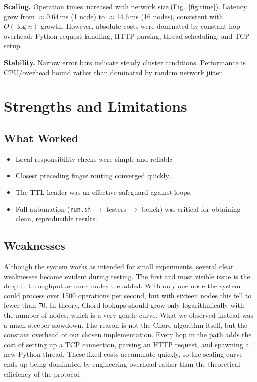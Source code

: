 \documentclass[conference]{IEEEtran}
\begin{document}
\textbf{Scaling.} Operation times increased with network size (Fig.~\ref{fig:time}). Latency grew from $\approx$0.64\,ms (1 node) to $\approx$14.6\,ms (16 nodes), consistent with $O(\log n)$ growth. However, absolute costs were dominated by constant hop overhead: Python request handling, HTTP parsing, thread scheduling, and TCP setup.  

\textbf{Stability.} Narrow error bars indicate steady cluster conditions. Performance is CPU/overhead bound rather than dominated by random network jitter.

\section{Strengths and Limitations}
\subsection{What Worked}
\begin{itemize}
  \item Local responsibility checks were simple and reliable.
  \item Closest preceding finger routing converged quickly.
  \item The TTL header was an effective safeguard against loops.
  \item Full automation (\texttt{run.sh} $\rightarrow$ testers $\rightarrow$ bench) was critical for obtaining clean, reproducible results.
\end{itemize}

\subsection{Weaknesses}
Although the system works as intended for small experiments, several clear weaknesses became evident during testing. The first and most visible issue is the drop in throughput as more nodes are added. With only one node the system could process over 1500 operations per second, but with sixteen nodes this fell to fewer than 70. 
In theory, Chord lookups should grow only logarithmically with the number of nodes, which is a very gentle curve. What we observed instead was a much steeper slowdown. 
The reason is not the Chord algorithm itself, but the constant overhead of our chosen implementation. Every hop in the path adds the cost of setting up a TCP connection, parsing an HTTP request, and spawning a new Python thread. These fixed costs accumulate quickly, so the scaling curve ends up being dominated by engineering overhead rather than the theoretical efficiency of the protocol.
\end{document}
